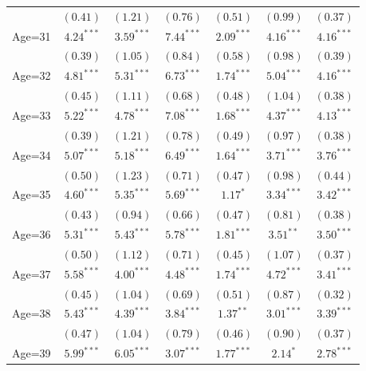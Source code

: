 \documentclass[fullpage]{paper}
\begin{document}
\begin{center}
\begin{longtable}{l c c c c c c }
            & $(0.41)$      & $(1.21)$      & $(0.76)$       & $(0.51)$      & $(0.99)$      & $(0.37)$      \\
Age=31      & $4.24^{***}$  & $3.59^{***}$  & $7.44^{***}$   & $2.09^{***}$  & $4.16^{***}$  & $4.16^{***}$  \\
            & $(0.39)$      & $(1.05)$      & $(0.84)$       & $(0.58)$      & $(0.98)$      & $(0.39)$      \\
Age=32      & $4.81^{***}$  & $5.31^{***}$  & $6.73^{***}$   & $1.74^{***}$  & $5.04^{***}$  & $4.16^{***}$  \\
            & $(0.45)$      & $(1.11)$      & $(0.68)$       & $(0.48)$      & $(1.04)$      & $(0.38)$      \\
Age=33      & $5.22^{***}$  & $4.78^{***}$  & $7.08^{***}$   & $1.68^{***}$  & $4.37^{***}$  & $4.13^{***}$  \\
            & $(0.39)$      & $(1.21)$      & $(0.78)$       & $(0.49)$      & $(0.97)$      & $(0.38)$      \\
Age=34      & $5.07^{***}$  & $5.18^{***}$  & $6.49^{***}$   & $1.64^{***}$  & $3.71^{***}$  & $3.76^{***}$  \\
            & $(0.50)$      & $(1.23)$      & $(0.71)$       & $(0.47)$      & $(0.98)$      & $(0.44)$      \\
Age=35      & $4.60^{***}$  & $5.35^{***}$  & $5.69^{***}$   & $1.17^{*}$    & $3.34^{***}$  & $3.42^{***}$  \\
            & $(0.43)$      & $(0.94)$      & $(0.66)$       & $(0.47)$      & $(0.81)$      & $(0.38)$      \\
Age=36      & $5.31^{***}$  & $5.43^{***}$  & $5.78^{***}$   & $1.81^{***}$  & $3.51^{**}$   & $3.50^{***}$  \\
            & $(0.50)$      & $(1.12)$      & $(0.71)$       & $(0.45)$      & $(1.07)$      & $(0.37)$      \\
Age=37      & $5.58^{***}$  & $4.00^{***}$  & $4.48^{***}$   & $1.74^{***}$  & $4.72^{***}$  & $3.41^{***}$  \\
            & $(0.45)$      & $(1.04)$      & $(0.69)$       & $(0.51)$      & $(0.87)$      & $(0.32)$      \\
Age=38      & $5.43^{***}$  & $4.39^{***}$  & $3.84^{***}$   & $1.37^{**}$   & $3.01^{***}$  & $3.39^{***}$  \\
            & $(0.47)$      & $(1.04)$      & $(0.79)$       & $(0.46)$      & $(0.90)$      & $(0.37)$      \\
Age=39      & $5.99^{***}$  & $6.05^{***}$  & $3.07^{***}$   & $1.77^{***}$  & $2.14^{*}$    & $2.78^{***}$  \\

\end{longtable}
\end{center}
\end{document}
